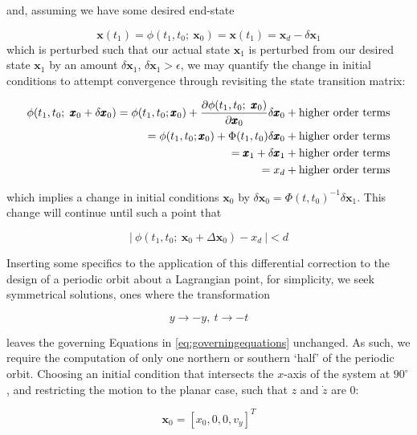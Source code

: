 \noindent and, assuming we have some desired end-state

\begin{equation}
\pmb{x}(t_1) = \phi(t_1, t_0;~\pmb{x}_0) = \pmb{x}(t_1) = \pmb{x}_d - \delta \pmb{x}_1
\end{equation}
\noindent which is perturbed such that our actual state $\pmb{x}_1$ is perturbed from our desired state $\pmb{x}_1$ by an amount $\delta \pmb{x}_1$, $\delta \pmb{x}_1 > \epsilon$, we may quantify the change in initial conditions to attempt convergence through revisiting the state transition matrix:

\begin{align}
\phi(t_1, t_0; ~\pmb{x}_0 + \delta \pmb{x}_0) = \phi(t_1, t_0; \pmb{x}_0) + \frac{\partial\phi (t_1, t_0;~\pmb{x}_0)}{\partial \pmb{x}_0} \delta \pmb{x}_0 + \textnormal{higher order terms} \\
= \phi(t_1, t_0; \pmb{x}_0) + \Phi(t_1, t_0) \delta \pmb{x}_0  + \textnormal{higher order terms}\\
= \pmb{x}_1 + \delta\pmb{x}_1 + \textnormal{higher order terms} \\
= x_d  + \textnormal{higher order terms}
\end{align}

\noindent which implies a change in initial conditions $\pmb{x}_0$ by $\delta \pmb{x}_0 = \Phi (t, t_0)^{-1}\delta\pmb{x}_1$. This change will continue until such a point that

\begin{equation}
|~\phi(t_1, t_0; ~\pmb{x}_0 + \Delta\pmb{x}_0) - x_d~| < d
\end{equation}

\noindent Inserting some specifics to the application of this differential correction to the design of a periodic orbit about a Lagrangian point, for simplicity, we seek symmetrical solutions, ones where the transformation

\begin{equation}
y \rightarrow -y, ~t \rightarrow -t
\end{equation}

\noindent leaves the governing Equations in \ref{eq:governingequations} unchanged. As such, we require the computation of only one northern or southern `half' of the periodic orbit. Choosing an initial condition that intersects the $x$-axis of the system at $90^\circ$, and restricting the motion to the planar case, such that $z$ and $\dot{z}$ are $0$:

\begin{equation}
\pmb{x}_0 = [x_0, 0, 0, v_y]^T
\end{equation}

